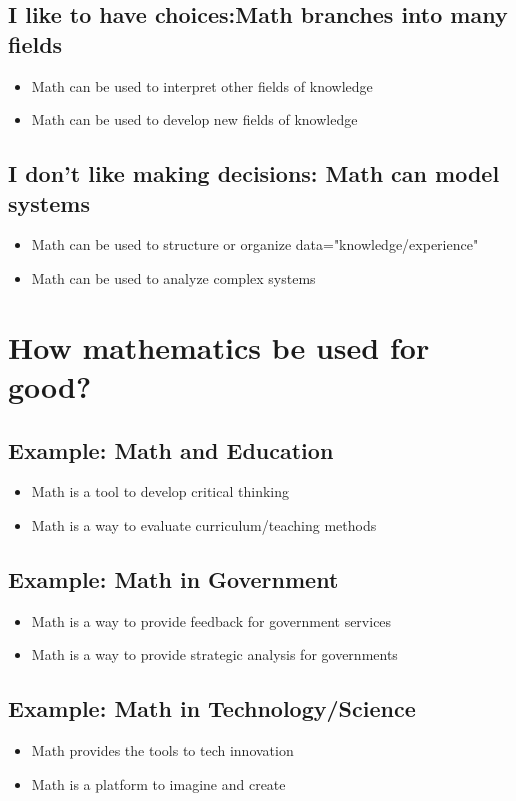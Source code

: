 \documentclass[12pt]{article}
\begin{document}
		\subsection{I like to have choices:Math branches into many fields}
			\begin{itemize}
				\item Math can be used to interpret other fields of knowledge
				\item Math can be used to develop new fields of knowledge
			\end{itemize}
		\subsection{I don't like making decisions: Math can model systems}
			\begin{itemize}
				\item Math can be used to structure or organize data="knowledge/experience"
				\item Math can be used to analyze complex systems
			\end{itemize}
	
	\section{How mathematics be used for good?}
	
		\subsection{Example: Math and Education}
			\begin{itemize}
				\item Math is a tool to develop critical thinking
				\item Math is a way to evaluate curriculum/teaching methods
			\end{itemize}
		
		\subsection{Example: Math in Government}
			\begin{itemize}
				\item Math is a way to provide feedback for government services
				\item Math is a way to provide strategic analysis for governments
			\end{itemize}
		\subsection{Example: Math in Technology/Science}	
			\begin{itemize}
				\item Math provides the tools to tech innovation
				\item Math is a platform to imagine and create
			\end{itemize}
\end{document}

